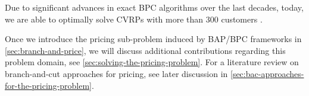 Due to significant advances in exact BPC algorithms over the last decades,
today,
we are able to optimally solve CVRPs with more than $300$ customers \parencite{costa2019}.

Once we introduce the pricing sub-problem induced by BAP/BPC frameworks
in \cref{sec:branch-and-price},
we will discuss additional contributions regarding this problem domain,
see \cref{sec:solving-the-pricing-problem}.
For a literature review on branch-and-cut approaches for pricing, see later discussion
in \cref{sec:bac-approaches-for-the-pricing-problem}.
